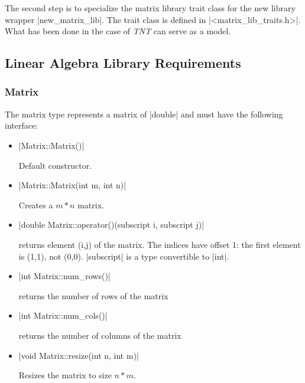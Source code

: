 \documentclass[12pt,twoside]{report}
\newcommand{\tnt}{\emph{TNT}}
\begin{document}
The second step is to specialize the matrix library trait class for the new library wrapper |new_matrix_lib|. The trait class is defined in |<matrix_lib_traits.h>|. What has been done in the case of \tnt{} can serve as a model.


\subsection{Linear Algebra Library Requirements}
\label{matrix_lib_req}

\htmlrule[CLEAR=all]  \subsubsection*{Matrix}
The matrix type represents a matrix of |double| and  must have the following interface:

\begin{itemize}

\item |Matrix::Matrix()|

Default constructor.

\item |Matrix::Matrix(int m, int n)|

Creates a $m*n$ matrix.


\item |double Matrix::operator()(subscript i, subscript j)|

returns element (i,j) of the matrix. The indices have offset 1: the first element is (1,1), not (0,0).
|subscript| is a type convertible to |int|.

\item |int Matrix::num_rows()|

returns the number of rows of the matrix

\item |int Matrix::num_cols()|

returns the number of columns of the matrix

\item |void Matrix::resize(int n, int m)|

Resizes the matrix to size $n*m$.

\end{itemize}
\end{document}
